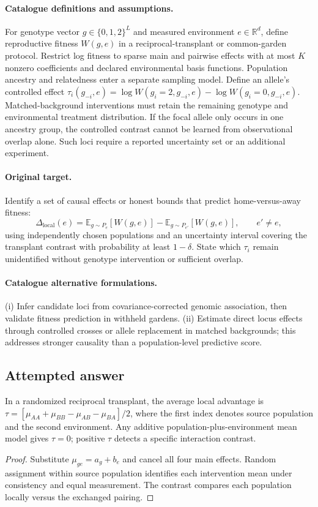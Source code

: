 \documentclass[11pt]{article}
\begin{document}
\paragraph{Catalogue definitions and assumptions.}
For genotype vector $g\in\{0,1,2\}^L$ and measured environment $e\in\mathbb{R}^d$, define reproductive fitness $W(g,e)$ in a reciprocal-transplant or common-garden protocol. Restrict log fitness to sparse main and pairwise effects with at most $K$ nonzero coefficients and declared environmental basis functions. Population ancestry and relatedness enter a separate sampling model. Define an allele's controlled effect $\tau_i(g_{-i},e)=\log W(g_i=2,g_{-i},e)-\log W(g_i=0,g_{-i},e)$. Matched-background interventions must retain the remaining genotype and environmental treatment distribution. If the focal allele only occurs in one ancestry group, the controlled contrast cannot be learned from observational overlap alone. Such loci require a reported uncertainty set or an additional experiment.
\paragraph{Original target.}
Identify a set of causal effects or honest bounds that predict home-versus-away fitness:
\[
 \Delta_{\mathrm{local}}(e)=
 \mathbb{E}_{g\sim P_e}[W(g,e)]-
 \mathbb{E}_{g\sim P_{e'}}[W(g,e)],\qquad e'\ne e,
\]
using independently chosen populations and an uncertainty interval covering the transplant contrast with probability at least $1-\delta$. State which $\tau_i$ remain unidentified without genotype intervention or sufficient overlap.
\paragraph{Catalogue alternative formulations.}
(i) Infer candidate loci from covariance-corrected genomic association, then validate fitness prediction in withheld gardens. (ii) Estimate direct locus effects through controlled crosses or allele replacement in matched backgrounds; this addresses stronger causality than a population-level predictive score.
\subsection{Attempted answer}
\begin{proposition}
In a randomized reciprocal transplant, the average local advantage is $\tau=[\mu_{AA}+\mu_{BB}-\mu_{AB}-\mu_{BA}]/2$, where the first index denotes source population and the second environment. Any additive population-plus-environment mean model gives $\tau=0$; positive $\tau$ detects a specific interaction contrast.
\end{proposition}
\begin{proof}
Substitute $\mu_{ge}=a_g+b_e$ and cancel all four main effects. Random assignment within source population identifies each intervention mean under consistency and equal measurement. The contrast compares each population locally versus the exchanged pairing.
\end{proof}
\end{document}
